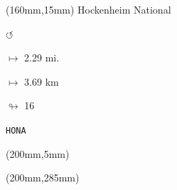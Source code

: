 \begin{textblock*}{40mm}(160mm,15mm)%
Hockenheim National
\par \Huge$\circlearrowleft$
\Large
\par$\mapsto$ 2.29 mi.
\par$\mapsto$ 3.69 km
\par$\looparrowright$ 16
\par\hfill\tiny\tt HONA\\
\end{textblock*}
\begin{textblock*}{20mm}(200mm,5mm)%
\fbox{\thepage}
\end{textblock*}
\begin{textblock*}{20mm}(200mm,285mm)%
\fbox{\thepage}
\end{textblock*}
\null\newpage

